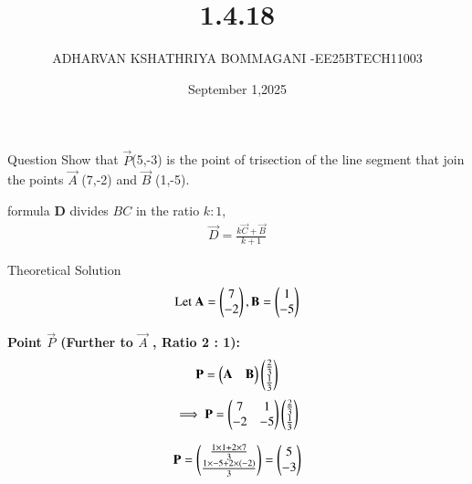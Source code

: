 \documentclass{beamer}
\begin{document}
\title 
{1.4.18}
\date{September 1,2025}


\author 
{ADHARVAN KSHATHRIYA BOMMAGANI -EE25BTECH11003}






\frame{\titlepage}
\begin{frame}{Question}
Show that $\vec{P}$(5,-3) is the point of trisection of the line segment that join the points  $\vec{A}$ (7,-2) and  $\vec{B}$ (1,-5).
\end{frame}

\begin{frame}{formula}
 \textbf{D} divides $BC$ in the ratio $k : 1$, 
\begin{align}
        \vec{D} = \frac{k\vec{C} + \vec{B}}{k + 1}
\end{align}
\end{frame}


\begin{frame}{Theoretical Solution}
\begin{align}
\text{Let } 
\mathbf{A} = \begin{pmatrix} 7 \\ -2 \end{pmatrix},
\mathbf{B} = \begin{pmatrix} 1 \\ -5 \end{pmatrix}
\end{align}


\textbf{Point  $\vec{P}$  (Further to  $\vec{A}$ , Ratio 2 : 1):}
\begin{align}
    \vec{P}=\begin{myvec}{\vec{A}& \vec{B}}\end{myvec}\begin{myvec}
        {\frac{2}{3}\\\frac{1}{3}}\end{myvec}    
\end{align}
\begin{align}
\implies \vec{P}=\begin{myvec}{ 7 & 1\\ -2 & -5 }\end{myvec}\begin{myvec}
        {\frac{2}{3}\\\frac{1}{3}}\end{myvec}\\
\end{align}


\begin{align}
\vec{P} = \begin{myvec}{
\frac{1 \times 1 + 2 \times 7}{3} \\
\frac{1 \times -5 + 2 \times (-2)}{3}
}\end{myvec}
= \begin{myvec}{ 5 \\ -3 }\end{myvec}
\end{align}
\end{frame}
\end{document}
